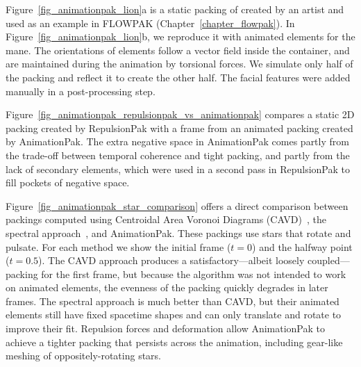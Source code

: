 
Figure~\ref{fig_animationpak_lion}a is a static packing of  created by an artist and
used as an example in FLOWPAK (Chapter~\ref{chapter_flowpak}).  In Figure~\ref{fig_animationpak_lion}b,
we reproduce it with animated elements for the mane.
The orientations of elements follow a vector field inside
the container, and are maintained during the animation by 
torsional forces.
We simulate only half of the packing and reflect it to create the other half.
The facial features were added manually in a post-processing step.

Figure~\ref{fig_animationpak_repulsionpak_vs_animationpak} compares
a static 2D packing created by RepulsionPak with a frame
from an animated packing created by AnimationPak.
The extra negative space in AnimationPak comes partly from the trade-off
between temporal coherence and tight packing, and partly from the lack
of secondary elements, which were used in a second pass in RepulsionPak 
to fill pockets of negative space.


Figure~\ref{fig_animationpak_star_comparison} offers a direct comparison between
packings computed using Centroidal Area Voronoi Diagrams
(CAVD)~\cite{Smith2005}, the spectral approach~\cite{Dalal2006}, and AnimationPak.
These packings use stars that rotate and pulsate.
For each method we show the initial frame ($t=0$) and the halfway point
($t=0.5$).  The CAVD approach produces a satisfactory---albeit
loosely coupled---packing for the first frame, but because the 
algorithm was not intended to work on animated elements, 
the evenness of the packing quickly degrades in later frames.
The spectral approach is much better
than CAVD, but their animated elements still have fixed spacetime shapes
and can only translate and rotate to improve their fit. 
Repulsion forces and deformation allow AnimationPak to achieve a tighter packing
that persists across the animation, including gear-like meshing of
oppositely-rotating stars.




